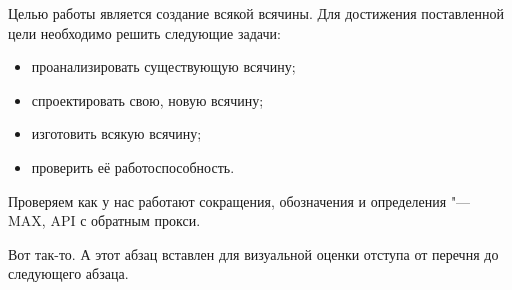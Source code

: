 \Introduction

Целью работы является создание всякой всячины. Для достижения поставленной цели необходимо решить следующие задачи:

\begin{itemize}
\item проанализировать существующую всячину;
\item спроектировать свою, новую всячину;
\item изготовить всякую всячину;
\item проверить её работоспособность.
\end{itemize}

Проверяем как у нас работают сокращения, обозначения и определения "---
MAX, 
API 
с обратным прокси.


Вот так-то. А этот абзац вставлен для визуальной оценки отступа от перечня до следующего абзаца.
